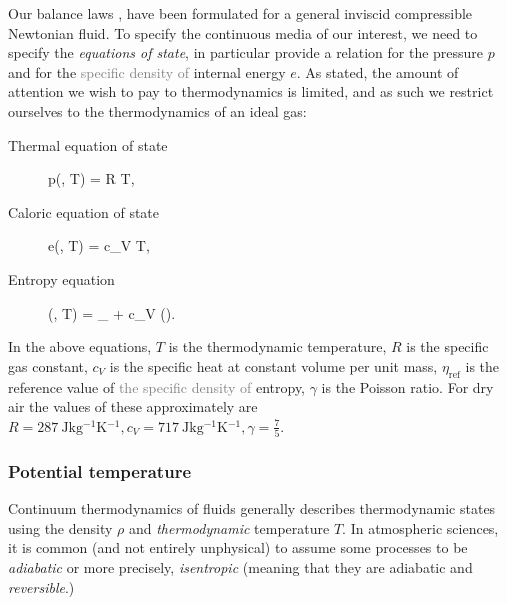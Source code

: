 \documentclass[../main.tex]{subfiles}
\begin{document}
Our balance laws ,  have been formulated for a general inviscid compressible Newtonian fluid. To specify the continuous media of our interest, we need to specify the \emph{equations of state}, in particular provide a relation for the pressure $p$ and for the \textcolor{gray}{specific density of} internal energy $e$. As stated, the amount of attention we wish to pay to thermodynamics is limited, and as such we restrict ourselves to the thermodynamics of an ideal gas:

\begin{description}
	\item[Thermal equation of state]\mbox{}
	\begin{equations}[single,!,numberline=all]
	\label{eq:THERMAL}
	p\left(\rho, T\right) = R \rho T,
	\end{equations}
	\item[Caloric equation of state]\mbox{}
	\begin{equations}[single,!,numberline=all]
	\label{eq:CALORIC}
	e\left(\rho, T\right) = c_V T,
	\end{equations}
	\item[Entropy equation]\mbox{}
	\begin{equations}[single,!,numberline=all]
	\label{eq:ENTROPY}
	\eta\left(\rho, T\right) = \eta_{} + c_V \log\left(\right).
	\end{equations}
\end{description}

In the above equations, $T$ is the thermodynamic temperature, $R$ is the specific gas constant, $c_V$ is the specific heat at constant volume per unit mass, $\eta_{\text{ref}}$ is the reference value of \textcolor{gray}{the specific density of} entropy, $\gamma$ is the Poisson ratio. For dry air the values of these approximately are $R = \qty{287}{\joule \kilogram^{-1} \kelvin^{-1}}, c_V = \qty{717}{\joule \kilogram^{-1} \kelvin^{-1}}, \gamma = \frac{7}{5}$.

\subsubsection{Potential temperature}
\label{sec:POTENTIAL_TEMP}

Continuum thermodynamics of fluids generally describes thermodynamic states using the density $\rho$ and \emph{thermodynamic} temperature $T$. In atmospheric sciences, it is common (and not entirely unphysical) to assume some processes to be \emph{adiabatic} or more precisely, \emph{isentropic} (meaning that they are adiabatic and \emph{reversible}.) 
\end{document}
